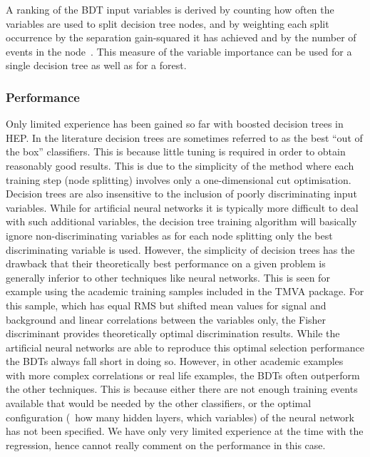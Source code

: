 A ranking of the BDT input variables is derived by counting how often the
variables are used to split decision tree nodes, and by weighting each 
split occurrence by the separation gain-squared it has achieved and by 
the number of events in the node~\cite{Breiman1984}. This measure of the
variable importance can be used for a single decision tree as well as for a 
forest.

\subsubsection{Performance}

Only limited experience has been gained so far with boosted decision
trees in HEP. In the literature decision trees are sometimes referred
to as the best ``out of the box'' classifiers. This is because little
tuning is required in order to obtain reasonably good results. This is
due to the simplicity of the method where each training step (node
splitting) involves only a one-dimensional cut optimisation. Decision
trees are also insensitive to the inclusion of poorly discriminating
input variables. While for artificial neural networks it is typically
more difficult to deal with such additional variables, the decision
tree training algorithm will basically ignore non-discriminating
variables as for each node splitting only the best discriminating
variable is used.  However, the simplicity of decision trees has the
drawback that their theoretically best performance on a
given problem is generally inferior to other techniques like neural
networks. This is seen for example using the academic training samples
included in the TMVA package. For this sample, which has equal RMS but
shifted mean values for signal and background and linear correlations
between the variables only, the Fisher discriminant provides
theoretically optimal discrimination results. While the artificial
neural networks are able to reproduce this optimal selection
performance the BDTs always fall short in doing so. However, in other
academic examples with more complex correlations or real life
examples, the BDTs often outperform the other techniques.  This is
because either there are not enough training events available that
would be needed by the other classifiers, or the optimal configuration
(\ie\ how many hidden layers, which variables) of the neural network
has not been specified. We have only very limited experience at the
time with the regression, hence cannot really comment on the performance
in this case.

